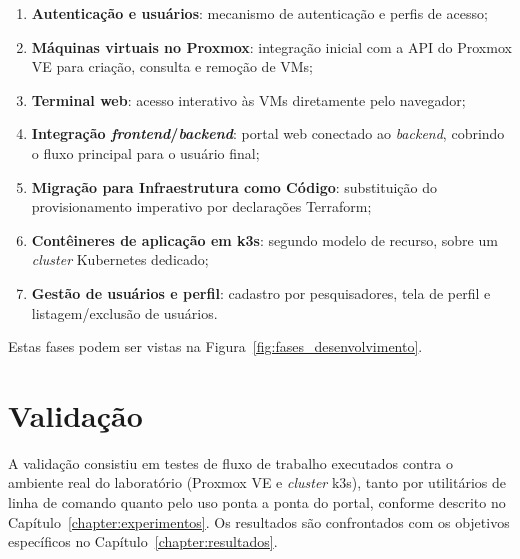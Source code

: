 \begin{enumerate}
    \item \textbf{Autenticação e usuários}: mecanismo de autenticação e perfis de acesso;
    \item \textbf{Máquinas virtuais no Proxmox}: integração inicial com a API do Proxmox VE para criação, consulta e remoção de VMs;
    \item \textbf{Terminal web}: acesso interativo às VMs diretamente pelo navegador;
    \item \textbf{Integração \textit{frontend}/\textit{backend}}: portal web conectado ao \textit{backend}, cobrindo o fluxo principal para o usuário final;
    \item \textbf{Migração para Infraestrutura como Código}: substituição do provisionamento imperativo por declarações Terraform;
    \item \textbf{Contêineres de aplicação em k3s}: segundo modelo de recurso, sobre um \textit{cluster} Kubernetes dedicado;
    \item \textbf{Gestão de usuários e perfil}: cadastro por pesquisadores, tela de perfil e listagem/exclusão de usuários.
\end{enumerate}

\par Estas fases podem ser vistas na Figura~\ref{fig:fases_desenvolvimento}.


\section{Validação}

A validação consistiu em testes de fluxo de trabalho executados contra o ambiente real do laboratório (Proxmox VE e \textit{cluster} k3s), tanto por utilitários de linha de comando quanto pelo uso ponta a ponta do portal, conforme descrito no Capítulo~\ref{chapter:experimentos}. Os resultados são confrontados com os objetivos específicos no Capítulo~\ref{chapter:resultados}.
